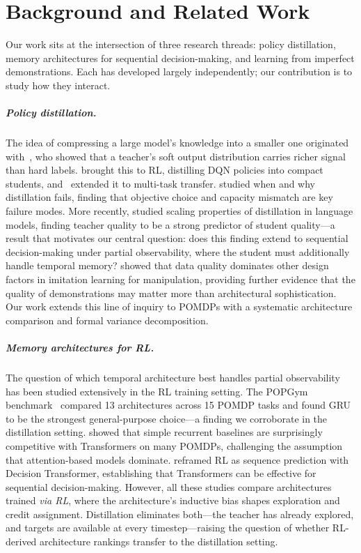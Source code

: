 \chapter{Background and Related Work}
\label{ch:related}

Our work sits at the intersection of three research threads: policy distillation, memory architectures for sequential decision-making, and learning from imperfect demonstrations.
Each has developed largely independently; our contribution is to study how they interact.

\paragraph{Policy distillation.}
The idea of compressing a large model's knowledge into a smaller one originated with~\citet{hinton2015distilling}, who showed that a teacher's soft output distribution carries richer signal than hard labels.
\citet{rusu2016policy} brought this to RL, distilling DQN policies into compact students, and~\citet{parisotto2016actormimic} extended it to multi-task transfer.
\citet{czarnecki2019distilling} studied when and why distillation fails, finding that objective choice and capacity mismatch are key failure modes.
More recently, \citet{busbridge2025distillation} studied scaling properties of distillation in language models, finding teacher quality to be a strong predictor of student quality---a result that motivates our central question: does this finding extend to sequential decision-making under partial observability, where the student must additionally handle temporal memory?
\citet{belkhale2023data} showed that data quality dominates other design factors in imitation learning for manipulation, providing further evidence that the quality of demonstrations may matter more than architectural sophistication.
Our work extends this line of inquiry to POMDPs with a systematic architecture comparison and formal variance decomposition.

\paragraph{Memory architectures for RL.}
The question of which temporal architecture best handles partial observability has been studied extensively in the RL training setting.
The POPGym benchmark~\citep{morad2023popgym} compared 13 architectures across 15 POMDP tasks and found GRU to be the strongest general-purpose choice---a finding we corroborate in the distillation setting.
\citet{ni2022transformers} showed that simple recurrent baselines are surprisingly competitive with Transformers on many POMDPs, challenging the assumption that attention-based models dominate.
\citet{chen2021decision} reframed RL as sequence prediction with Decision Transformer, establishing that Transformers can be effective for sequential decision-making.
However, all these studies compare architectures trained \emph{via RL}, where the architecture's inductive bias shapes exploration and credit assignment.
Distillation eliminates both---the teacher has already explored, and targets are available at every timestep---raising the question of whether RL-derived architecture rankings transfer to the distillation setting.

